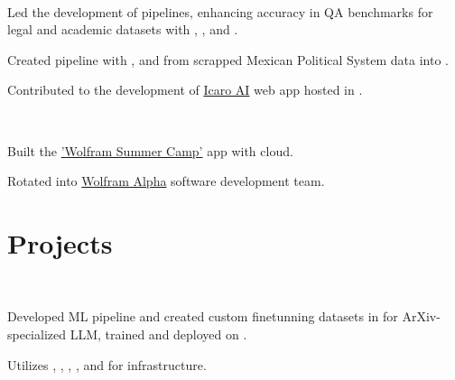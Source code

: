 \documentclass[]{tex/deedy-resume-openfont}
\begin{document}
\begin{minipage}[t]{0.66\textwidth}
\\
\begin{tightemize}
    \item Led the development of  pipelines, enhancing accuracy in QA benchmarks for legal and academic datasets with , , and .
    \item Created  pipeline with ,  and  from scrapped Mexican Political System data into .
    \item Contributed to the  development of \href{http://www.icaro.ai/home/}{Icaro AI} web app hosted in .
\end{tightemize}
\sectionsep

\\
\begin{tightemize}
    \item Built the \href{https://education.wolfram.com/summer-camp/}{'Wolfram Summer Camp'} app with \href{https://www.wolfram.com/wolfram-one/}{} cloud.
    \item Rotated into \href{https://www.wolframalpha.com/}{Wolfram Alpha} software development team. 
\end{tightemize}
\sectionsep


\section{Projects}

\\
\begin{tightemize}
    \item Developed ML pipeline and created custom finetunning datasets in  for ArXiv-specialized LLM, trained and deployed on .
    \item Utilizes , , , ,  and  for infrastructure.
\end{tightemize}
\sectionsep


\end{minipage}
\end{document}
